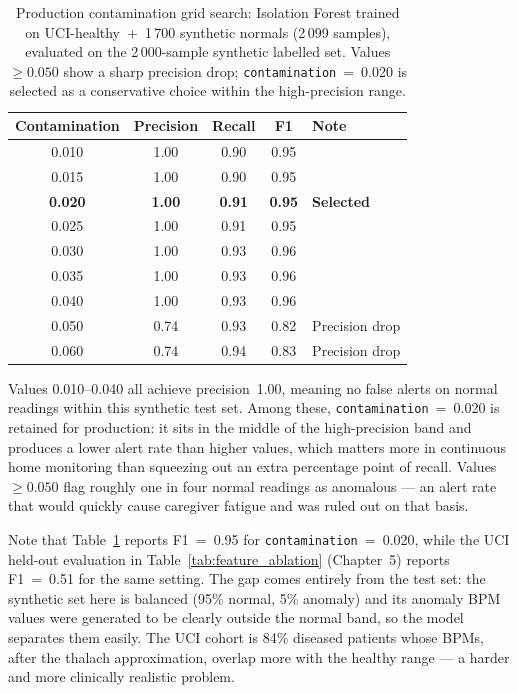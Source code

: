 \begin{table}[H]
\centering
\caption[Production contamination grid search results]{Production contamination grid search: Isolation Forest trained on UCI-healthy~+~1\,700 synthetic normals (2\,099 samples), evaluated on the 2\,000-sample synthetic labelled set. Values $\geq 0.050$ show a sharp precision drop; \texttt{contamination}~=~0.020 is selected as a conservative choice within the high-precision range.}
\label{tab:contamination_grid}
\small
\begin{tabular}{@{} c c c c l @{}}
\toprule
\textbf{Contamination} & \textbf{Precision} & \textbf{Recall} & \textbf{F1} & \textbf{Note} \\
\midrule
0.010 & 1.00 & 0.90 & 0.95 & \\
0.015 & 1.00 & 0.90 & 0.95 & \\
\textbf{0.020} & \textbf{1.00} & \textbf{0.91} & \textbf{0.95} & \textbf{Selected} \\
0.025 & 1.00 & 0.91 & 0.95 & \\
0.030 & 1.00 & 0.93 & 0.96 & \\
0.035 & 1.00 & 0.93 & 0.96 & \\
0.040 & 1.00 & 0.93 & 0.96 & \\
0.050 & 0.74 & 0.93 & 0.82 & Precision drop \\
0.060 & 0.74 & 0.94 & 0.83 & Precision drop \\
\bottomrule
\end{tabular}
\end{table}

Values 0.010--0.040 all achieve precision~1.00, meaning no false alerts on normal readings within this synthetic test set. Among these, \texttt{contamination}~=~0.020 is retained for production: it sits in the middle of the high-precision band and produces a lower alert rate than higher values, which matters more in continuous home monitoring than squeezing out an extra percentage point of recall. Values $\geq 0.050$ flag roughly one in four normal readings as anomalous --- an alert rate that would quickly cause caregiver fatigue and was ruled out on that basis.

Note that Table~\ref{tab:contamination_grid} reports F1~=~0.95 for \texttt{contamination}~=~0.020, while the UCI held-out evaluation in Table~\ref{tab:feature_ablation} (Chapter~5) reports F1~=~0.51 for the same setting. The gap comes entirely from the test set: the synthetic set here is balanced (95\% normal, 5\% anomaly) and its anomaly BPM values were generated to be clearly outside the normal band, so the model separates them easily. The UCI cohort is 84\% diseased patients whose BPMs, after the thalach approximation, overlap more with the healthy range --- a harder and more clinically realistic problem.

